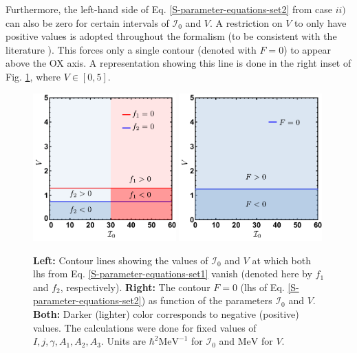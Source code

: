Furthermore, the left-hand side of Eq. \ref{S-parameter-equations-set2} from case $ii)$ can also be zero for certain intervals of $\mathcal{I}_0$ and $V$. A restriction on $V$ to only have positive values is adopted throughout the formalism (to be consistent with the literature \cite{shou2009coupling,tanabe2017stability,poenaru2021parity}). This forces only a single contour (denoted with $F=0$) to appear above the OX axis. A representation showing this line is done in the right inset of Fig. \ref{fig-vanishing-f1-f2-F}, where $V\in[0,5]$.
\begin{figure}
    \centering
    \includegraphics[width=0.49\textwidth]{Chapters/Figures/f1f2_solutions-edited.pdf}
    \includegraphics[width=0.49\textwidth]{Chapters/Figures/F_solutions_B-term.pdf}
    \caption{\textbf{Left:} Contour lines showing the values of $\mathcal{I}_0$ and $V$ at which both lhs from Eq. \ref{S-parameter-equations-set1} vanish (denoted here by $f_1$ and $f_2$, respectively). \textbf{Right:} The contour $F=0$ (lhs of Eq. \ref{S-parameter-equations-set2}) as function of the parameters $\mathcal{I}_0$ and $V$. \textbf{Both:} Darker (lighter) color corresponds to negative (positive) values. The calculations were done for fixed values of $I, j, \gamma, A_1, A_2, A_3$. Units are $\hbar^2\text{MeV}^{-1}$ for $\mathcal{I}_0$ and $\text{MeV}$ for $V$.}
    \label{fig-vanishing-f1-f2-F}
\end{figure}

